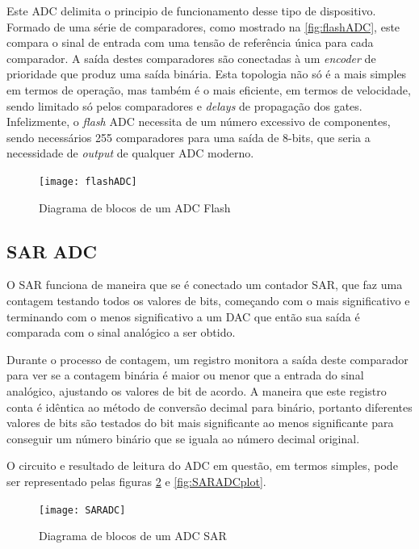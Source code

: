     Este \gls{ADC} delimita o principio de funcionamento desse tipo de dispositivo. Formado de uma série de comparadores, como mostrado na \autoref{fig:flashADC}, este compara o sinal de entrada com uma tensão de referência única para cada comparador. A saída destes comparadores são conectadas à um \textit{encoder} de prioridade que produz uma saída binária. 
    Esta topologia não só é a mais simples em termos de operação, mas também é o mais eficiente, em termos de velocidade, sendo limitado só pelos comparadores e \textit{delays} de propagação dos gates. Infelizmente, o \textit{flash} \gls{ADC} necessita de um número excessivo de componentes, sendo necessários 255 comparadores para uma saída de 8-bits, que seria a necessidade de \textit{output} de qualquer \gls{ADC} moderno. 

    \begin{figure}[htb!]%
        \caption{Diagrama de blocos de um ADC Flash}%
        \label{fig:flashADC}%
        \texttt{[image: flashADC]}%
    \end{figure}  

    \subsection{SAR ADC}\label{SARADC}
    O \gls{SAR} funciona de maneira que se é conectado um contador \gls{SAR}, que faz uma contagem testando todos os valores de bits, começando com o mais significativo e terminando com o menos significativo a um \gls{DAC} que então sua saída é comparada com o sinal analógico a ser obtido. 
    
    Durante o processo de contagem, um registro monitora a saída deste comparador para ver se a contagem binária é maior ou menor que a entrada do sinal analógico, ajustando os valores de bit de acordo. A maneira que este registro conta é idêntica ao método de conversão decimal para binário, portanto diferentes valores de bits são testados do bit mais significante ao menos significante para conseguir um número binário que se iguala ao número decimal original. 

    O circuito e resultado de leitura do \gls{ADC} em questão, em termos simples, pode ser representado pelas figuras \ref{fig:SARADC} e \ref{fig:SARADCplot}.

    \begin{figure}[htb!]%
        \caption{Diagrama de blocos de um ADC SAR}%
        \label{fig:SARADC}%
        \texttt{[image: SARADC]}%
    \end{figure}  

